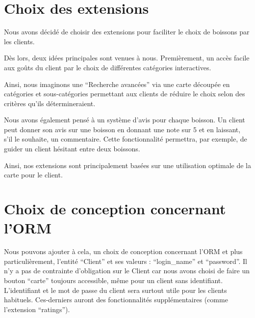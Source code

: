 

\section{Choix des extensions}
Nous avons décidé de choisir des extensions pour faciliter
le choix de boissons par les clients.

Dès lors, deux idées principales sont venues à nous. 
Premièrement, un accès facile aux goûts du client par 
le choix de différentes catégories interactives.

Ainsi, nous imaginons une ``Recherche avancées'' via une carte 
découpée en catégories et sous-catégories permettant aux clients de
réduire le choix selon des critères qu'ils détermineraient. 

Nous avons également pensé à un système d'avis pour chaque boisson. 
Un client peut donner son avis sur une boisson en donnant une note
sur 5 et en laissant, s'il le souhaite, un commentaire. Cette
fonctionnalité permettra, par exemple, de guider un client hésitant
entre deux boissons.

Ainsi, nos extensions sont principalement basées sur une utilisation
optimale de la carte pour le client.

\section{Choix de conception concernant l'ORM}
Nous pouvons ajouter à cela, un choix de conception concernant l'ORM 
et plus particulièrement, l'entité ``Client'' et ses valeurs : 
``login\_name'' et ``password''. Il n'y a pas de contrainte d'obligation sur le Client 
car nous avons choisi de faire un bouton ``carte'' toujours accessible, 
même pour un client sans identifiant. L'identifiant et le mot de passe du client sera 
surtout utile pour les clients habituels. Ces-derniers auront des fonctionnalités 
supplémentaires (comme l'extension ``ratings'').

